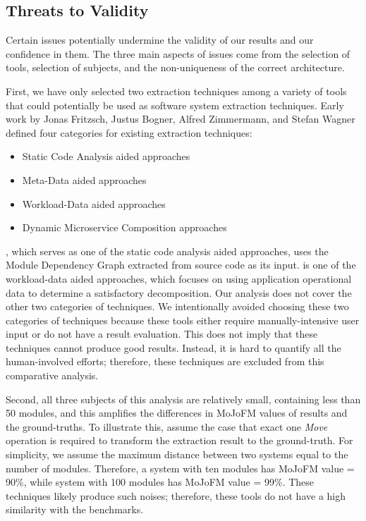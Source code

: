 \subsection{Threats to Validity}
\label{sec:threats}


Certain issues potentially undermine the validity of our results and our confidence in them. The three main aspects of issues come from the selection of tools, selection of subjects, and the non-uniqueness of the correct architecture.

First, we have only selected two extraction techniques among a variety of tools that could potentially be used as software system extraction techniques. Early work by Jonas Fritzsch, Justus Bogner, Alfred Zimmermann, and Stefan Wagner defined four categories for existing extraction techniques:
\begin{itemize}
    \item Static Code Analysis aided approaches
    \item Meta-Data aided approaches
    \item Workload-Data aided approaches
    \item Dynamic Microservice Composition approaches
\end{itemize}


\bn, which serves as one of the static code analysis aided approaches, uses the Module Dependency Graph extracted from source code as its input. \fs is one of the workload-data aided approaches, which focuses on using application operational data to determine a satisfactory decomposition. Our analysis does not cover the other two categories of techniques. We intentionally avoided choosing these two categories of techniques because these tools either require manually-intensive user input or do not have a result evaluation. This does not imply that these techniques cannot produce good results. Instead, it is hard to quantify all the human-involved efforts; therefore, these techniques are excluded from this comparative analysis.

Second, all three subjects of this analysis are relatively small, containing less than 50 modules, and this amplifies the differences in MoJoFM values of results and the ground-truths. To illustrate this, assume the case that exact one \textit{Move} operation is required to transform the extraction result to the ground-truth. For simplicity, we assume the maximum distance between two systems equal to the number of modules. Therefore, a system with ten modules  has  MoJoFM  value  =  90\%, while system with 100 modules has MoJoFM value = 99\%. These techniques likely produce such noises; therefore, these tools do not have a high similarity with the benchmarks. 

